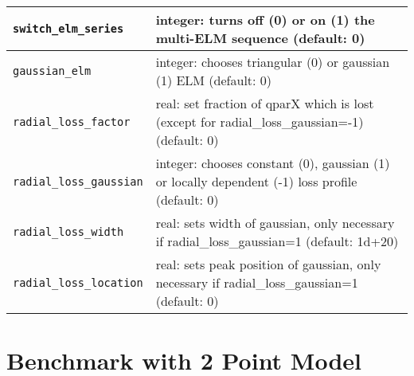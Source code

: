 \documentclass[amsmath,amssymb,a4]{revtex4-2}
\begin{document}
\begin{table}[h]
\begin{center}
\begin{tabular}{|| l  | l ||}
    {\tt switch\_elm\_series}    & integer: turns off (0) or on (1) the multi-ELM sequence (default: 0) \\ \hline
        {\tt gaussian\_elm}      & integer: chooses triangular (0) or gaussian (1) ELM (default: 0) \\ \hline
        {\tt radial\_loss\_factor} & real: set fraction of qparX which is lost (except for radial\_loss\_gaussian=-1) (default: 0) \\ \hline
        {\tt radial\_loss\_gaussian} & integer: chooses constant (0), gaussian (1) or locally dependent (-1) loss profile (default: 0) \\ \hline
        {\tt radial\_loss\_width}  & real: sets width of gaussian, only necessary if radial\_loss\_gaussian=1 (default: 1d+20) \\ \hline
        {\tt radial\_loss\_location} & real: sets peak position of gaussian, only necessary if radial\_loss\_gaussian=1 (default: 0) \\ \hline      
        \hline
  \end{tabular}
\end{center}
\end{table}

\section{Benchmark with 2 Point Model}
\end{document}
